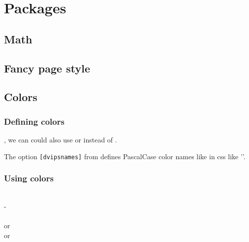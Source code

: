 \section{Packages}
\subsection{Math}
\begin{latex}
\usepackage{amsmath} %
\usepackage{mathtools} %
\usepackage{amssymb} %
\usepackage{amsfonts} %
\usepackage{mathrsfs} %
\end{latex}

\subsection{Fancy page style}
\begin{latex}
\usepackage{fancyhdr}
\end{latex}

\subsection{Colors}
\begin{latex}
\usepackage{color}
\usepackage[dvipsnames]{xcolor}
\end{latex}
\subsubsection* {Defining colors}
, we can could also use  or  instead of
.

The option \texttt{[dvipsnames]} from  defines PascalCase color names like in css like
''.

\subsubsection{Using colors}
\\
 - \\
\code{\pagecolor{White}}\\
or \\
or 

